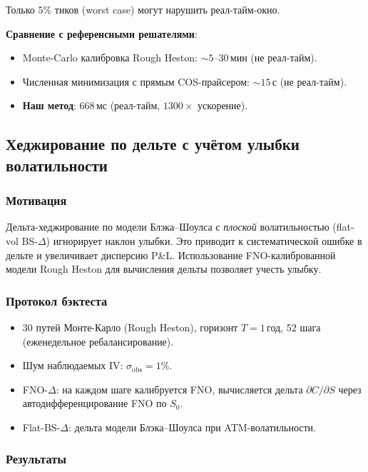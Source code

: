 Только $5\%$ тиков (worst case) могут нарушить реал-тайм-окно.

\textbf{Сравнение с референсными решателями}:
\begin{itemize}
  \item Monte-Carlo калибровка Rough Heston: $\sim 5$--$30\,\text{мин}$ (не реал-тайм).
  \item Численная минимизация с прямым COS-прайсером: $\sim 15\,\text{с}$ (не реал-тайм).
  \item \textbf{Наш метод}: $668\,\text{мс}$ (реал-тайм, $1300\times$ ускорение).
\end{itemize}

\subsection{Хеджирование по дельте с учётом улыбки волатильности}
\label{sec:hedging}

\subsubsection{Мотивация}

Дельта-хеджирование по модели Блэка--Шоулса с \textit{плоской} волатильностью
(flat-vol BS-$\Delta$) игнорирует наклон улыбки. Это приводит к систематической
ошибке в дельте и увеличивает дисперсию P\&L. Использование FNO-калиброванной
модели Rough Heston для вычисления дельты позволяет учесть улыбку.

\subsubsection{Протокол бэктеста}

\begin{itemize}
  \item 30 путей Монте-Карло (Rough Heston), горизонт $T = 1\,\text{год}$,
        52 шага (еженедельное ребалансирование).
  \item Шум наблюдаемых IV: $\sigma_{\text{obs}} = 1\%$.
  \item FNO-$\Delta$: на каждом шаге калибруется FNO, вычисляется дельта
        $\partial C/\partial S$ через автодифференцирование FNO по $S_0$.
  \item Flat-BS-$\Delta$: дельта модели Блэка--Шоулса при ATM-волатильности.
\end{itemize}

\subsubsection{Результаты}

